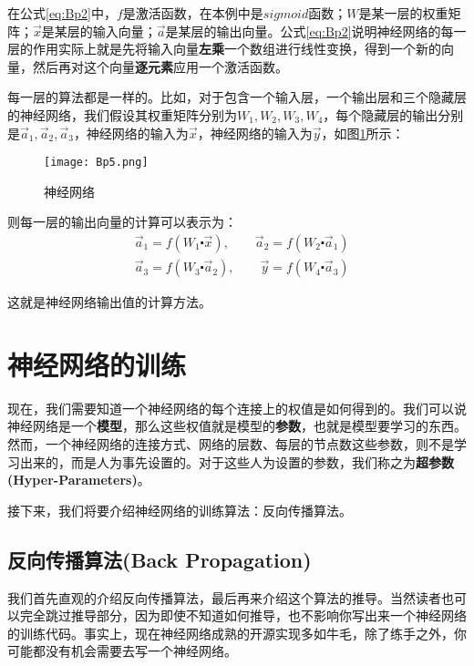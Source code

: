 在公式\ref{eq:Bp2}中，\(f\)是激活函数，在本例中是\(sigmoid\)函数；\(W\)是某一层的权重矩阵；\(\vec{x}\)是某层的输入向量；\(\vec{a}\)是某层的输出向量。公式\ref{eq:Bp2}说明神经网络的每一层的作用实际上就是先将输入向量\textbf{左乘}一个数组进行线性变换，得到一个新的向量，然后再对这个向量\textbf{逐元素}应用一个激活函数。

每一层的算法都是一样的。比如，对于包含一个输入层，一个输出层和三个隐藏层的神经网络，我们假设其权重矩阵分别为\(W_1,W_2,W_3,W_4\)，每个隐藏层的输出分别是\(\vec{a}_1,\vec{a}_2,\vec{a}_3\)，神经网络的输入为\(\vec{x}\)，神经网络的输入为\(\vec{y}\)，如图\ref{fig:Bp5}所示：

\begin{figure}[htbp]
	\centering
	\texttt{[image: Bp5.png]}
	\caption{神经网络}
	\label{fig:Bp5}
\end{figure}

则每一层的输出向量的计算可以表示为：
\begin{align*}
	 & \vec{a}_1=f(W_1\centerdot\vec{x}),\qquad \vec{a}_2=f(W_2\centerdot\vec{a}_1) \\
	 & \vec{a}_3=f(W_3\centerdot\vec{a}_2),\qquad\vec{y}=f(W_4\centerdot\vec{a}_3)
\end{align*}


这就是神经网络输出值的计算方法。


\section{神经网络的训练}\label{Bp:5}

现在，我们需要知道一个神经网络的每个连接上的权值是如何得到的。我们可以说神经网络是一个\textbf{模型}，那么这些权值就是模型的\textbf{参数}，也就是模型要学习的东西。然而，一个神经网络的连接方式、网络的层数、每层的节点数这些参数，则不是学习出来的，而是人为事先设置的。对于这些人为设置的参数，我们称之为\textbf{超参数(Hyper-Parameters)}。

接下来，我们将要介绍神经网络的训练算法：反向传播算法。


\subsection{反向传播算法(Back Propagation)}\label{Bp:6}

我们首先直观的介绍反向传播算法，最后再来介绍这个算法的推导。当然读者也可以完全跳过推导部分，因为即使不知道如何推导，也不影响你写出来一个神经网络的训练代码。事实上，现在神经网络成熟的开源实现多如牛毛，除了练手之外，你可能都没有机会需要去写一个神经网络。

